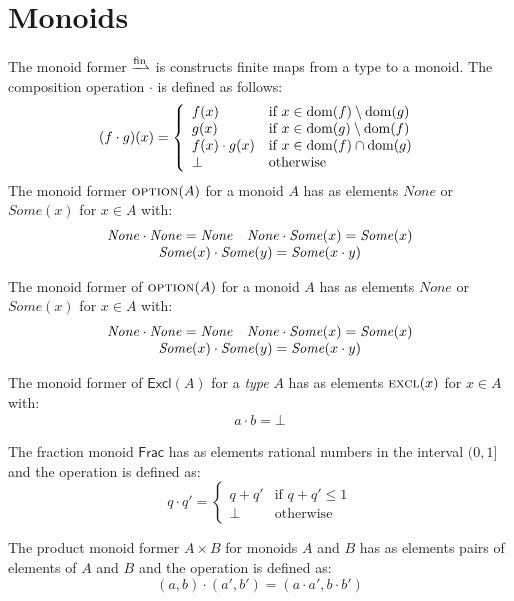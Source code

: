 \documentclass[]{scrartcl}
\newcommand{\None}{\mathit{None}}
\newcommand{\Some}{\mathit{Some}}
\newcommand{\option}{\textmon{option}}
\newcommand{\Excl}{\textsf{Excl}}
\newcommand{\excl}{\textmon{excl}}
\newcommand{\Frac}{\textsf{Frac}}
\begin{document}



\appendix
\section{Monoids}\label{sec:app-mon}
The monoid former $\fpfn$ is constructs finite maps from a type to a monoid.
The composition operation $\cdot$ is defined as follows:
\[
(f \cdot g) (x) = \left\{
\begin{array}{ll}
f(x) & \text{if } x \in \mathrm{dom}(f)\setminus\mathrm{dom}(g)\\
g(x) & \text{if } x \in \mathrm{dom}(g)\setminus\mathrm{dom}(f)\\
f(x) \cdot g(x) & \text{if } x \in \mathrm{dom}(f)\cap\mathrm{dom}(g)\\
\bot & \text{otherwise}
\end{array}
\right.
\]
The monoid former $\option(A)$ for a monoid $A$ has as elements 
$\None$ or $\Some(x)$ for $x \in A$ with:
\[
\begin{array}{ll}
\None \cdot \None = \None & \None \cdot \Some(x) = \Some(x) \\
\multicolumn{2}{c}{\Some(x) \cdot \Some(y) = \Some(x \cdot y)}
\end{array}
\]

The monoid former of $\option(A)$ for a monoid $A$ has as elements 
$\None$ or $\Some(x)$ for $x \in A$ with:
\[
\begin{array}{ll}
\None \cdot \None = \None & \None \cdot \Some(x) = \Some(x) \\
\multicolumn{2}{c}{\Some(x) \cdot \Some(y) = \Some(x \cdot y)}
\end{array}
\]

The monoid former of $\Excl(A)$ for a \emph{type} $A$ has as elements 
$\excl(x)$ for $x \in A$ with:
\[
\begin{array}{ll}
a \cdot b = \bot
\end{array}
\]

The fraction monoid $\Frac$ has as elements rational numbers in the interval $(0, 1]$ and the operation is defined as:
\[
q \cdot q' = \left\{
\begin{array}{ll}
q + q' & \text{if } q + q' \le 1\\
\bot & \text{otherwise}
\end{array}
\right.
\]

The product monoid former $A \times B$ for monoids $A$ and $B$ has as elements pairs of elements of $A$ and $B$ and the operation is defined as:
\[
(a, b) \cdot (a', b') = (a \cdot a', b \cdot b')
\]
\end{document}
